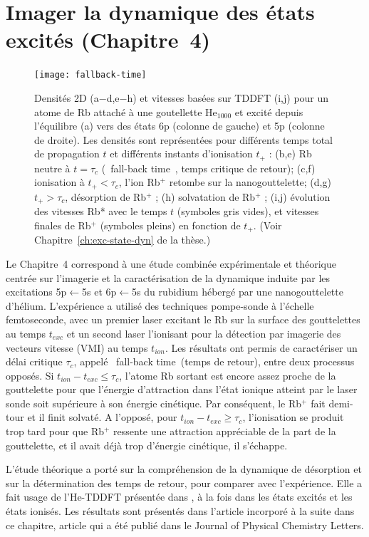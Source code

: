 	\section*{Imager la dynamique des états excités \small{(Chapitre~4)}}
		\begin{figure}
			\texttt{[image: fallback-time]}\label{fig:fallback-time}
			\caption{Densités 2D (a−d,e−h) et vitesses basées sur TDDFT (i,j) pour un atome de Rb attaché à une goutellette He$_{1000}$ et excité depuis l'équilibre (a) vers des états 6p (colonne de gauche) et 5p (colonne de droite). 
			Les densités sont représentées pour différents temps total de propagation $t$ et différents instants d'ionisation $t_+$ : (b,e) Rb neutre à  $t=\tau_c$ (\guillemotleft~fall-back time~\guillemotright{}, temps critique de retour); (c,f) ionisation à $t_+<\tau_c$, l'ion Rb$^+$ retombe sur la nanogouttelette; (d,g) $t_+>\tau_c$, désorption de Rb$^+$ ; (h) solvatation de Rb$^+$ ; (i,j) évolution des vitesses Rb* avec le temps $t$ (symboles gris vides), et vitesses finales de Rb$^+$ (symboles pleins) en fonction de $t_+$. (Voir Chapitre~\ref{ch:exc-state-dyn} de la thèse.)}
		\end{figure}		
		Le  Chapitre~4 correspond à une étude combinée expérimentale et théorique centrée sur l'imagerie et la caractérisation de la dynamique induite par les excitations 5p$\leftarrow$5s et 6p$\leftarrow$5s du rubidium hébergé par une nanogouttelette d'hélium. 
		L'expérience a utilisé des techniques pompe-sonde à l'échelle femtoseconde, avec un premier laser excitant le Rb sur la surface des gouttelettes au temps $t_{exc}$ et un second laser l'ionisant pour la détection par imagerie des vecteurs vitesse (VMI) au temps $t_{ion}$. 
		Les résultats ont permis de caractériser un délai critique $\tau_c$, appelé \guillemotleft~fall-back time~\guillemotright (temps de retour), entre deux processus opposés. 
		Si $t_{ion}-t_{exc}\leq\tau_c$, l'atome Rb sortant est encore assez proche de la gouttelette pour que l'énergie d'attraction dans l'état ionique atteint par le laser sonde soit supérieure à son énergie cinétique. 
		Par conséquent, le Rb$^+$ fait demi-tour et il finit solvaté. 
		A l'opposé, pour $t_{ion}-t_{exc}\geq\tau_c$, l'ionisation se produit trop tard pour que Rb$^+$ ressente une attraction appréciable de la part de la gouttelette, et il avait déjà trop d'énergie cinétique, il s'échappe.
		
		L'étude théorique a porté sur la compréhension de la dynamique de désorption et sur la détermination des temps de retour, pour comparer avec l'expérience. 
		Elle a fait usage de l'He-TDDFT présentée dans , à la fois dans les états excités et les états ionisés. 
		Les résultats sont présentés dans l'article incorporé à la suite dans ce chapitre, article qui a été publié dans le Journal of Physical Chemistry Letters\citep{Vangerow2017}.
		
